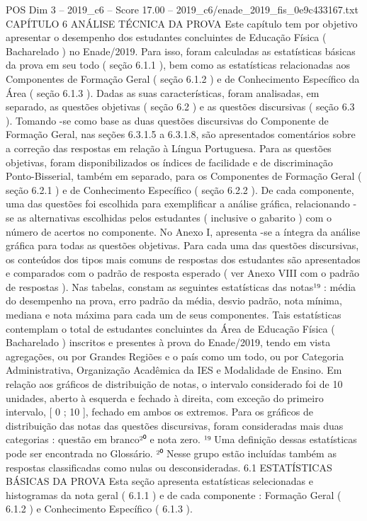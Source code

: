 \begin{textsample}{POS Dim 3 – 2019\_c6 – Score 17.00 – 2019\_c6/enade\_2019\_fis\_0e9c433167.txt}  \label{ex:f3_pos_006}
CAPÍTULO 6 ANÁLISE TÉCNICA DA PROVA Este capítulo tem por objetivo apresentar o desempenho dos estudantes concluintes de Educação Física ( Bacharelado ) no Enade/2019.
Para isso, foram calculadas as estatísticas básicas da prova em seu todo ( seção 6.1.1 ), bem como as estatísticas relacionadas aos Componentes de Formação Geral ( seção 6.1.2 ) e de Conhecimento Específico da Área ( seção 6.1.3 ).
Dadas as suas características, foram analisadas, em separado, as questões objetivas ( seção 6.2 ) e as questões discursivas ( seção 6.3 ).
Tomando -se como base as duas questões discursivas do Componente de Formação Geral, nas seções 6.3.1.5 a 6.3.1.8, são apresentados comentários sobre a correção das respostas em relação à Língua Portuguesa.
Para as questões objetivas, foram disponibilizados os índices de facilidade e de discriminação Ponto-Bisserial, também em separado, para os Componentes de Formação Geral ( seção 6.2.1 ) e de Conhecimento Específico ( seção 6.2.2 ).
De cada componente, uma das questões foi escolhida para exemplificar a análise gráfica, relacionando -se as alternativas escolhidas pelos estudantes ( inclusive o gabarito ) com o número de acertos no componente.
No Anexo I, apresenta -se a íntegra da análise gráfica para todas as questões objetivas.
Para cada uma das questões discursivas, os conteúdos dos tipos mais comuns de respostas dos estudantes são apresentados e comparados com o padrão de resposta esperado ( ver Anexo VIII com o padrão de respostas ).
Nas tabelas, constam as seguintes estatísticas das notas¹⁹ : média do desempenho na prova, erro padrão da média, desvio padrão, nota mínima, mediana e nota máxima para cada um de seus componentes.
Tais estatísticas contemplam o total de estudantes concluintes da Área de Educação Física ( Bacharelado ) inscritos e presentes à prova do Enade/2019, tendo em vista agregações, ou por Grandes Regiões e o país como um todo, ou por Categoria Administrativa, Organização Acadêmica da IES e Modalidade de Ensino.
Em relação aos gráficos de distribuição de notas, o intervalo considerado foi de 10 unidades, aberto à esquerda e fechado à direita, com exceção do primeiro intervalo, [ 0 ; 10 ], fechado em ambos os extremos.
Para os gráficos de distribuição das notas das questões discursivas, foram consideradas mais duas categorias : questão em branco²⁰ e nota zero. ¹⁹ Uma definição dessas estatísticas pode ser encontrada no Glossário. ²⁰ Nesse grupo estão incluídas também as respostas classificadas como nulas ou desconsideradas. 6.1 ESTATÍSTICAS BÁSICAS DA PROVA Esta seção apresenta estatísticas selecionadas e histogramas da nota geral ( 6.1.1 ) e de cada componente : Formação Geral ( 6.1.2 ) e Conhecimento Específico ( 6.1.3 ).

\end{textsample}
